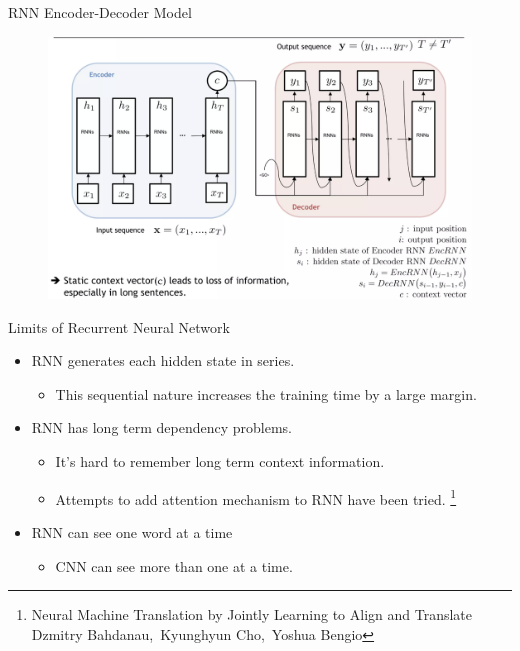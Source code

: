 \documentclass{beamer}
\begin{document}
\begin{frame}{RNN Encoder-Decoder Model}
\begin{figure}
    \centering
    \includegraphics[width=1\linewidth]{f2.png}
    \label{fig:enter-label}
\end{figure}
    
\end{frame}

\begin{frame}{Limits of Recurrent Neural Network}

\begin{itemize}
    \item RNN generates each hidden state in series.
        \begin{itemize}
            \item This sequential nature increases the training time by a large margin.
        \end{itemize}
    \item RNN has long term dependency problems.
        \begin{itemize}
            \item It's hard to remember long term context information.
            \item Attempts to add attention mechanism to RNN have been tried. \footnote{Neural Machine Translation by Jointly Learning to Align and Translate Dzmitry Bahdanau, Kyunghyun Cho, Yoshua Bengio}
        \end{itemize}
    \item RNN can see one word at a time
        \begin{itemize}
            \item CNN can see more than one at a time.
        \end{itemize}
\end{itemize}
\end{frame}
\end{document}
